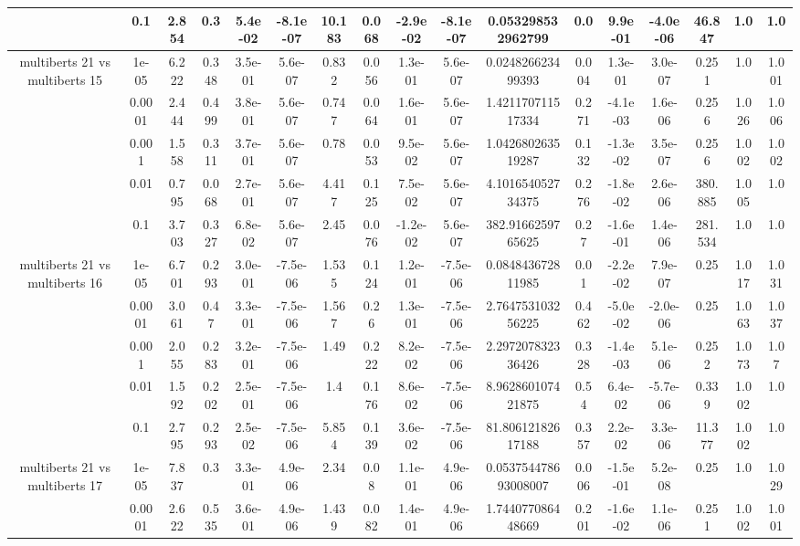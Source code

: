 \begin{tabular}{|c|c|c|c|c|c|c|c|c|c|c|c|c|c|c|c|c|}
 & 0.1 & 2.854 & 0.3 & 5.4e-02 & -8.1e-07 & 10.183 & 0.068 & -2.9e-02 & -8.1e-07 & 0.053298532962799 & 0.0 & 9.9e-01 & -4.0e-06 & 46.847 & 1.0 & 1.0 \\
\hline
\multirow{5}{*}{multiberts 21 vs multiberts 15} & 1e-05 & 6.222 & 0.348 & 3.5e-01 & 5.6e-07 & 0.832 & 0.056 & 1.3e-01 & 5.6e-07 & 0.024826623499393 & 0.004 & 1.3e-01 & 3.0e-07 & 0.251 & 1.0 & 1.001 \\
 & 0.0001 & 2.444 & 0.499 & 3.8e-01 & 5.6e-07 & 0.747 & 0.064 & 1.6e-01 & 5.6e-07 & 1.421170711517334 & 0.271 & -4.1e-03 & 1.6e-06 & 0.256 & 1.026 & 1.006 \\
 & 0.001 & 1.558 & 0.311 & 3.7e-01 & 5.6e-07 & 0.78 & 0.053 & 9.5e-02 & 5.6e-07 & 1.042680263519287 & 0.132 & -1.3e-02 & 3.5e-07 & 0.256 & 1.002 & 1.002 \\
 & 0.01 & 0.795 & 0.068 & 2.7e-01 & 5.6e-07 & 4.417 & 0.125 & 7.5e-02 & 5.6e-07 & 4.101654052734375 & 0.276 & -1.8e-02 & 2.6e-06 & 380.885 & 1.005 & 1.0 \\
 & 0.1 & 3.703 & 0.327 & 6.8e-02 & 5.6e-07 & 2.45 & 0.076 & -1.2e-02 & 5.6e-07 & 382.9166259765625 & 0.27 & -1.6e-01 & 1.4e-06 & 281.534 & 1.0 & 1.0 \\
\hline
\multirow{5}{*}{multiberts 21 vs multiberts 16} & 1e-05 & 6.701 & 0.293 & 3.0e-01 & -7.5e-06 & 1.535 & 0.124 & 1.2e-01 & -7.5e-06 & 0.084843672811985 & 0.01 & -2.2e-02 & 7.9e-07 & 0.25 & 1.017 & 1.031 \\
 & 0.0001 & 3.061 & 0.47 & 3.3e-01 & -7.5e-06 & 1.567 & 0.26 & 1.3e-01 & -7.5e-06 & 2.764753103256225 & 0.462 & -5.0e-02 & -2.0e-06 & 0.25 & 1.063 & 1.037 \\
 & 0.001 & 2.055 & 0.283 & 3.2e-01 & -7.5e-06 & 1.49 & 0.222 & 8.2e-02 & -7.5e-06 & 2.297207832336426 & 0.328 & -1.4e-03 & 5.1e-06 & 0.252 & 1.073 & 1.07 \\
 & 0.01 & 1.592 & 0.202 & 2.5e-01 & -7.5e-06 & 1.4 & 0.176 & 8.6e-02 & -7.5e-06 & 8.962860107421875 & 0.54 & 6.4e-02 & -5.7e-06 & 0.339 & 1.002 & 1.0 \\
 & 0.1 & 2.795 & 0.293 & 2.5e-02 & -7.5e-06 & 5.854 & 0.139 & 3.6e-02 & -7.5e-06 & 81.80612182617188 & 0.357 & 2.2e-02 & 3.3e-06 & 11.377 & 1.002 & 1.0 \\
\hline
\multirow{5}{*}{multiberts 21 vs multiberts 17} & 1e-05 & 7.837 & 0.3 & 3.3e-01 & 4.9e-06 & 2.34 & 0.08 & 1.1e-01 & 4.9e-06 & 0.053754478693008007 & 0.006 & -1.5e-01 & 5.2e-08 & 0.25 & 1.0 & 1.029 \\
 & 0.0001 & 2.622 & 0.535 & 3.6e-01 & 4.9e-06 & 1.439 & 0.082 & 1.4e-01 & 4.9e-06 & 1.744077086448669 & 0.201 & -1.6e-02 & 1.1e-06 & 0.251 & 1.002 & 1.001 \\

\end{tabular}
